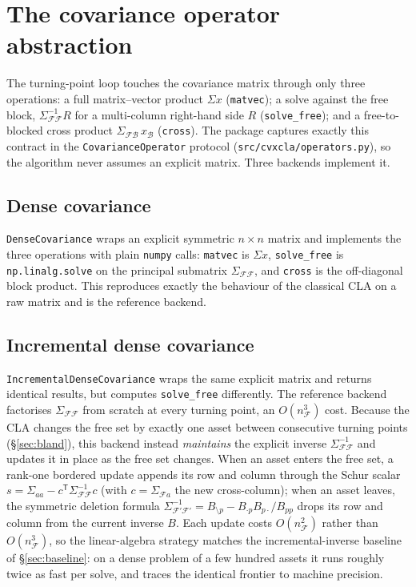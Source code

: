 \documentclass[11pt]{article}
\newcommand{\Sig}{\Sigma}
\newcommand{\F}{\mathcal{F}}        %
\newcommand{\B}{\mathcal{B}}        %
\newcommand{\trans}{^{\mathsf{T}}}
\newcommand{\inv}{^{-1}}
\begin{document}
\section{The covariance operator abstraction}
\label{sec:operators}

The turning-point loop touches the covariance matrix through only three operations:
a full matrix--vector product $\Sig x$ (\texttt{matvec}); a solve against the free block,
$\Sig_{\F\F}\inv R$ for a multi-column right-hand side $R$ (\texttt{solve\_free}); and a
free-to-blocked cross product $\Sig_{\F\B}\,x_\B$ (\texttt{cross}). The package captures
exactly this contract in the \texttt{CovarianceOperator} protocol
(\texttt{src/cvxcla/operators.py}), so the algorithm never assumes an explicit matrix.
Three backends implement it.

\subsection{Dense covariance}

\texttt{DenseCovariance} wraps an explicit symmetric $n\times n$ matrix and implements
the three operations with plain \texttt{numpy} calls: \texttt{matvec} is $\Sig x$,
\texttt{solve\_free} is \texttt{np.linalg.solve} on the principal submatrix
$\Sig_{\F\F}$, and \texttt{cross} is the off-diagonal block product. This reproduces
exactly the behaviour of the classical CLA on a raw matrix and is the reference
backend.

\subsection{Incremental dense covariance}
\label{sec:incremental}

\texttt{IncrementalDenseCovariance} wraps the same explicit matrix and returns
identical results, but computes \texttt{solve\_free} differently. The reference
backend factorises $\Sig_{\F\F}$ from scratch at every turning point, an
$O(n_\F^3)$ cost. Because the CLA changes the free set by exactly one asset
between consecutive turning points (\S\ref{sec:bland}), this backend instead
\emph{maintains} the explicit inverse $\Sig_{\F\F}\inv$ and updates it in place as
the free set changes. When an asset enters the free set, a rank-one bordered
update appends its row and column through the Schur scalar
$s = \Sig_{aa} - c\trans \Sig_{\F\F}\inv c$ (with $c = \Sig_{\F a}$ the new
cross-column); when an asset leaves, the symmetric deletion formula
$\Sig_{\F'\F'}\inv = B_{\setminus p} - B_{\cdot p}B_{p\cdot}/B_{pp}$ drops its row
and column from the current inverse $B$. Each update costs $O(n_\F^2)$ rather than
$O(n_\F^3)$, so the linear-algebra strategy matches the incremental-inverse
baseline of \S\ref{sec:baseline}: on a dense problem of a few hundred assets it
runs roughly twice as fast per solve, and traces the identical frontier to machine
precision.
\end{document}
